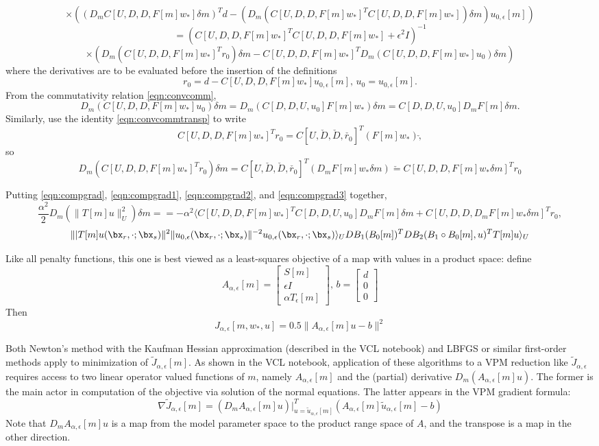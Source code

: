 $$
\times ((D_mC[U,D,D,F[m]w_*]\delta m)^Td -(D_m(C[U,D,D,F[m]w_*]^TC[U,D,D,F[m]w_*])\delta m)u_{0,\epsilon}[m])
$$
$$
=(C[U,D,D,F[m]w_*]^TC[U,D,D,F[m]w_*] + \epsilon^2 I)^{-1}
$$
$$
\times
(D_m(C[U,D,D,F[m]w_*]^Tr_0)\delta m  - C[U,D,D,F[m]w_*]^TD_m(C[U,D,D,F[m]w_*]u_0)\delta m)
$$ 
where the derivatives are to be evaluated before the insertion of the definitions 
$$
r_0 = d -C[U,D,D,F[m]w_*]u_{0,\epsilon}[m], \, u_0 = u_{0,\epsilon}[m].
$$
From the commutativity relation \ref{eqn:convcomm},
\begin{equation}
  \label{eqn:compgrad2}
D_m(C[U,D,D,F[m]w_*]u_0)\delta m = D_m(C[D,D,U,u_0]F[m]w_*)\delta m
=C[D,D,U,u_0]D_mF[m]\delta m.
\end{equation}
Similarly, use the identity \ref{eqn:convcommtransp} to write
$$
C[U,D,D,F[m]w_*]^Tr_0 = C[U,\check{D},\check{D},\check{r_0}]^T({F[m]w_*})\check, 
$$
so
\begin{equation} \label{eqn:compgrad3}
  D_m(C[U,D,D,F[m]w_*]^Tr_0)\delta m
  =C[U,\check{D},\check{D},\check{r_0}]^T(D_mF[m]w_* \delta m)\check= C[U,D,D,F[m]w_*\delta m]^Tr_0
\end{equation}


Putting \ref{eqn:compgrad}, \ref{eqn:compgrad1}, \ref{eqn:compgrad2},
and \ref{eqn:compgrad3} together,
\[
  \frac{\alpha^2}{2} D_m(\|T[m]u\|_U^2)\delta m =
=-\alpha^2 \langle C[U,D,D,F[m]w_*]^TC[D,D,U,u_0]D_mF[m]\delta m +C[U,D,D, D_mF[m]w_*
\delta m]^Tr_0, 
\]
\[
 \||T[m]u(\bx_r,\cdot;\bx_s)\|^2
  \|u_{0,\epsilon}(\bx_r,\cdot;\bx_s)\|^{-2}u_{0,\epsilon}(\bx_r,\cdot;\bx_s)\rangle_U
  DB_1(B_0[m])^TDB_2(B_1\circ
  B_0[m],u)^TT[m]u\rangle_U
\]

Like all penalty functions, this one is best viewed as a least-squares objective of a map with values in a product space: define
$$
A_{\alpha,\epsilon}[m] =  
\left[
\begin{array}{c}
S[m]\\
\epsilon I\\
\alpha T_{\epsilon}[m]
\end{array}
\right]
, \, b = \left[
\begin{array}{c}
d\\
0\\
0
\end{array}
\right]
$$
Then
$$
J_{\alpha,\epsilon}[m,w_*,u] = 0.5\|A_{\alpha,\epsilon}[m]u-b\|^2
$$

Both Newton's method with the Kaufman Hessian approximation (described in the VCL notebook) and LBFGS or similar first-order methods apply to minimization of $\tilde{J}_{\alpha,\epsilon}[m]$. As shown in the VCL notebook, application of these algorithms to a VPM reduction like $\tilde{J}_{\alpha,\epsilon}$ requires access to two linear operator valued functions of $m$, namely $A_{\alpha,\epsilon}[m]$ and the (partial) derivative $D_m(A_{\alpha,\epsilon}[m]u)$. The former is the main actor in computation of the objective via solution of the normal equations. The latter appears in the VPM gradient formula:
$$
\nabla \tilde{J}_{\alpha,\epsilon}[m] = (D_m A_{\alpha,\epsilon}[m]u)|_{u=\tilde{u}_{\alpha,\epsilon}[m]}^T(A_{\alpha,\epsilon}[m]\tilde{u}_{\alpha,\epsilon}[m] -b)
$$
Note that $D_m A_{\alpha,\epsilon}[m]u$ is a map from the model parameter space to the product range space of $A$, and the transpose is a map in the other direction. 
